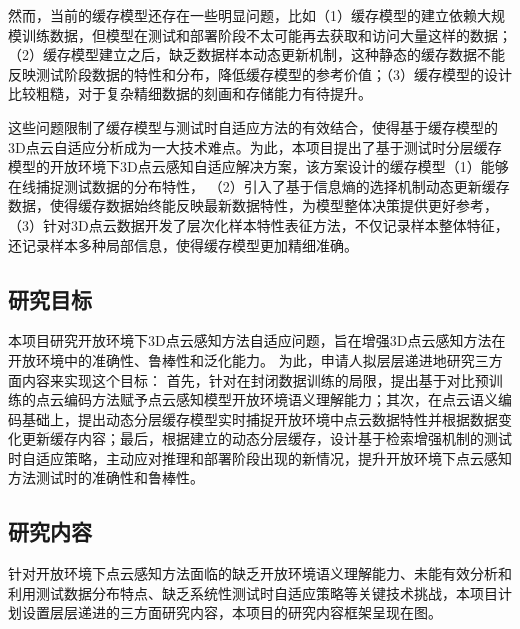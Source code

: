 \documentclass[12pt]{article}
\begin{document}
然而，当前的缓存模型还存在一些明显问题，比如（1）缓存模型的建立依赖大规模训练数据，但模型在测试和部署阶段不太可能再去获取和访问大量这样的数据；（2）缓存模型建立之后，缺乏数据样本动态更新机制，这种静态的缓存数据不能反映测试阶段数据的特性和分布，降低缓存模型的参考价值；（3）缓存模型的设计比较粗糙，对于复杂精细数据的刻画和存储能力有待提升。

这些问题限制了缓存模型与测试时自适应方法的有效结合，使得基于缓存模型的3D点云自适应分析成为一大技术难点。为此，本项目提出了基于测试时分层缓存模型的开放环境下3D点云感知自适应解决方案，该方案设计的缓存模型（1）能够在线捕捉测试数据的分布特性，
（2）引入了基于信息熵的选择机制动态更新缓存数据，使得缓存数据始终能反映最新数据特性，为模型整体决策提供更好参考，（3）针对3D点云数据开发了层次化样本特性表征方法，不仅记录样本整体特征，还记录样本多种局部信息，使得缓存模型更加精细准确。


{


}



\subsection{研究目标}

本项目研究开放环境下3D点云感知方法自适应问题，旨在增强3D点云感知方法在开放环境中的准确性、鲁棒性和泛化能力。
为此，申请人拟层层递进地研究三方面内容来实现这个目标：
首先，针对在封闭数据训练的局限，提出基于对比预训练的点云编码方法赋予点云感知模型开放环境语义理解能力；其次，在点云语义编码基础上，提出动态分层缓存模型实时捕捉开放环境中点云数据特性并根据数据变化更新缓存内容；最后，根据建立的动态分层缓存，设计基于检索增强机制的测试时自适应策略，主动应对推理和部署阶段出现的新情况，提升开放环境下点云感知方法测试时的准确性和鲁棒性。

\subsection{研究内容}

针对开放环境下点云感知方法面临的缺乏开放环境语义理解能力、未能有效分析和利用测试数据分布特点、缺乏系统性测试时自适应策略等关键技术挑战，本项目计划设置层层递进的三方面研究内容，本项目的研究内容框架呈现在图。
\end{document}
